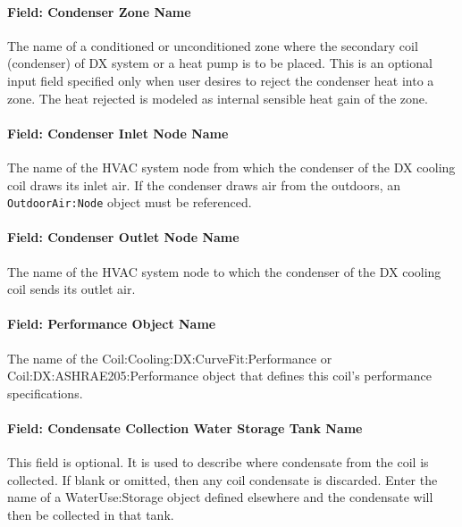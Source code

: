 \paragraph{Field: Condenser Zone Name}\label{field-condenser-zone-name-6-001}

The name of a conditioned or unconditioned zone where the secondary coil (condenser) of DX system or a heat pump is to be placed. This is an optional input field specified only when user desires to reject the condenser heat into a zone. The heat rejected is modeled as internal sensible heat gain of the zone.

\paragraph{Field: Condenser Inlet Node Name}\label{field-condenser-inlet-node-name-6-001}

The name of the HVAC system node from which the condenser of the DX cooling coil draws its inlet air. If the condenser draws air from the outdoors, an \texttt{OutdoorAir:Node} object must be referenced.

\paragraph{Field: Condenser Outlet Node Name}\label{field-condenser-outlet-node-name-6-001}

The name of the HVAC system node to which the condenser of the DX cooling coil sends its outlet air.

\paragraph{Field: Performance Object Name}\label{field-performance-object-name-6-001}

The name of the Coil:Cooling:DX:CurveFit:Performance or Coil:DX:ASHRAE205:Performance object that defines this coil's performance specifications.

\paragraph{Field: Condensate Collection Water Storage Tank Name}

This field is optional. It is used to describe where condensate from the coil is collected. If blank or omitted, then any coil condensate is discarded. Enter the name of a WaterUse:Storage object defined elsewhere and the condensate will then be collected in that tank.

